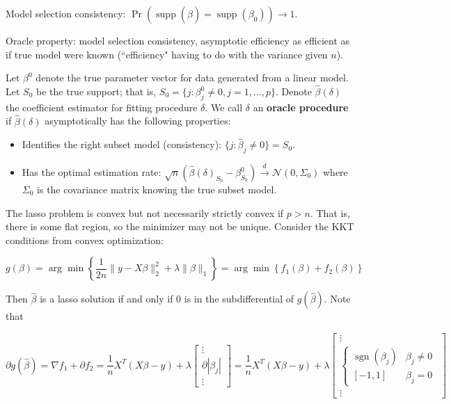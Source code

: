 Model selection consistency: \(\Pr(\operatorname{supp}(\hat{\beta}) = \operatorname{supp}(\beta_0) ) \to 1\).

Oracle property: model selection consistency, asymptotic efficiency as efficient as if true model were known (``efficiency" having to do with the variance given \(n\)).

\begin{definition} Let \(\beta^0\) denote the true parameter vector for data generated from a linear model. Let \(S_0\) be the true support; that is, \(S_0 = \{j: \beta_j^0 \neq 0, j = 1, \ldots, p\}\). Denote \(\hat{\beta}(\delta)\) the coefficient estimator for fitting procedure \(\delta\). We call \(\delta\) an \textbf{oracle procedure} if \(\hat{\beta}(\delta)\) asymptotically has the following properties:

\begin{itemize}

\item Identifies the right subset model (consistency): \(\{j: \hat{\beta}_j \neq 0\} = S_0\).

\item Has the optimal estimation rate: \(\sqrt{n}(\hat{\beta}(\delta)_{S_0} - \beta_{S_0}^0) \xrightarrow{d} \mathcal{N}(0, \Sigma_0)\) where \(\Sigma_0\) is the covariance matrix knowing the true subset model.

\end{itemize}

\end{definition}

The lasso problem is convex but not necessarily strictly convex if \(p > n\). That is, there is some flat region, so the minimizer may not be unique. Consider the KKT conditions from convex optimization:

\[
g(\beta) = \arg \min \left\{ \frac{1}{2n} \lVert y - X \beta \rVert_2^2 + \lambda \lVert \beta \rVert_1 \right\} =  \arg \min \left\{ f_1(\beta) + f_2(\beta) \right\}
\]

Then \(\hat{\beta}\) is a lasso solution if and only if 0 is in the subdifferential of \(g(\hat{\beta})\). Note that 

\[
\partial g(\hat{\beta}) = \nabla f_1 + \partial f_2 = \frac{1}{n} X^T(X \beta - y) + \lambda \begin{bmatrix}  \vdots \\ \partial | \beta_j | \\ \vdots \end{bmatrix} = \frac{1}{n} X^T(X \beta - y) + \lambda \begin{bmatrix}  \vdots \\ \begin{cases}  \operatorname{sgn}(\beta_j) & \beta_j \neq 0 \\ [-1, 1] & \beta_j = 0 \end{cases} \\ \vdots \end{bmatrix}
\]


